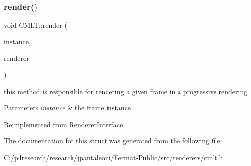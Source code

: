 \subsubsection{\texorpdfstring{render()}{render()}}
{\footnotesize\ttfamily void C\+M\+L\+T\+::render (\begin{DoxyParamCaption}\item[{const uint32}]{instance,  }\item[{\hyperlink{struct_rendering_context}{Rendering\+Context} \&}]{renderer }\end{DoxyParamCaption})\hspace{0.3cm}{\ttfamily [virtual]}}

this method is responsible for rendering a given frame in a progressive rendering


\begin{DoxyParams}{Parameters}
{\em instance} & the frame instance \\
\hline
\end{DoxyParams}


Reimplemented from \hyperlink{struct_renderer_interface_aa64254dd44c94929b05092dc8d74f29d}{Renderer\+Interface}.



The documentation for this struct was generated from the following file\+:\begin{DoxyCompactItemize}
\item 
C\+:/p4research/research/jpantaleoni/\+Fermat-\/\+Public/src/renderers/cmlt.\+h\end{DoxyCompactItemize}
